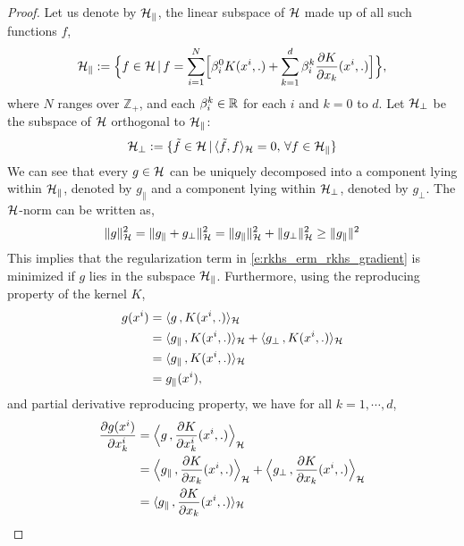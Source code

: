 \begin{proof}
Let us denote by ${\cal H}_\parallel$, the linear subspace of ${\cal H}$ made up of all such functions $f$,
	\[
	{\cal H}_\parallel := \Bigl\{f \in {\cal H}\, |\, f = \sum_{i=1}^N \Bigl[ \beta^0_i K(x^i,.) + \sum_{k=1}^d \beta_i^k \frac{\partial K }{\partial x_k} (x^i, .)\Bigr]\Bigr\},
	\]
	where $N$ ranges over $\mathbb{Z}_+$, and  each $\beta_i^k \in \mathbb{R}$ for each $i$ and $k = 0$ to $d$. Let ${\cal H}_{\perp}$ be the subspace of ${\cal H}$ orthogonal to ${\cal H}_\parallel$:
	\[
	{\cal H}_\perp : = \{ \tilde f \in {\cal H}\,| \, \langle \tilde f , f \rangle_{\cal H} = 0 ,\, \forall f \in {\cal H}_\parallel \}
	\]
	We can see that every $g \in {\cal H}$ can be uniquely decomposed into a component lying within ${\cal H}_\parallel$, denoted by $g_\parallel$ and a component lying within ${\cal H}_\perp$, denoted by $g_\perp$.
	The ${\cal H}$-norm can be written as,
	\begin{equation}
	\|g\|^2_\clH = \|g_\parallel + g_\perp\|^2_\clH = \|g_\parallel\|^2_\clH + \|g_\perp\|^2_\clH \geq \|g_\parallel\|^2
	\label{e:rkhs_g_reg}
	\end{equation}
	This implies that the regularization term in \eqref{e:rkhs_erm_rkhs_gradient} is minimized if $g$ lies in the subspace ${\cal H}_\parallel$. Furthermore, using the reproducing property of the kernel $K$,
	\begin{equation}
	\begin{aligned}
	g(x^i) & =  \langle g \, , K(x^i,.) \rangle_\clH\\
	&  = \langle g_\parallel\, , K(x^i,.) \rangle_\clH + \langle g_\perp \, , K(x^i,.) \rangle_\clH \\
	&  = \langle g_\parallel\, , K(x^i,.) \rangle_\clH \\
	&  = g_\parallel(x^i),
	\end{aligned}
	\label{e:rkhs_g_parallel}
	\end{equation}
	and partial derivative reproducing property, we have for all $k = 1, \cdots, d$,
	\begin{equation}
	\begin{aligned}
	\frac{\partial g(x^i)}{\partial x^i_k} & = \Bigl \langle g \, , \frac{\partial K}{\partial x^i_k} (x^i,.) \Bigr \rangle_\clH\\
	&  = \Bigl \langle g_\parallel\, , \frac{\partial K}{\partial x_k} (x^i,.)  \Bigr \rangle_\clH + \Bigl \langle g_\perp \, ,\frac{\partial K}{\partial x_k} (x^i,.) \Bigr \rangle_\clH \\
	&  = \langle g_\parallel\, , \frac{\partial K}{\partial x_k} (x^i,.) \rangle_\clH \\

\end{aligned}
\end{equation}
\end{proof}
